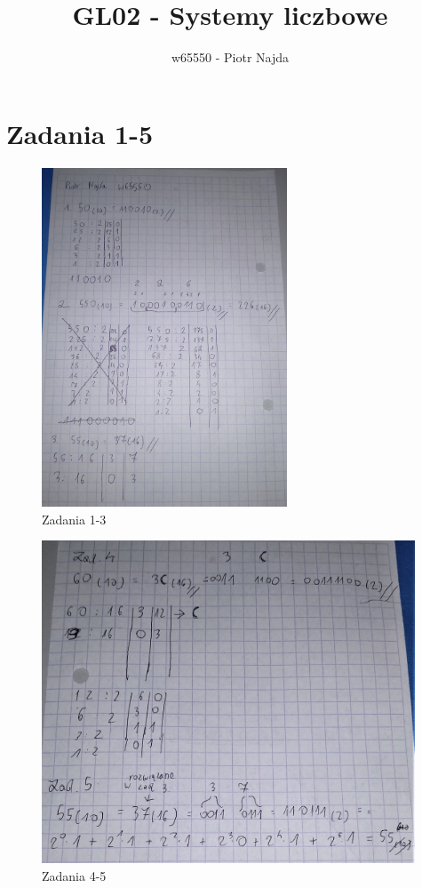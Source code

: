 \documentclass[12pt,a4paper]{article}
\title{GL02 - Systemy liczbowe}
\author{w65550 - Piotr Najda}
\begin{document}
\maketitle

\section{Zadania 1-5}

\begin{figure}[h]
\centering
\includegraphics[width=0.65\textwidth]{IMG_20211026_084539.jpg}
\caption{\label{fig:zad1do3}Zadania 1-3}
\end{figure}

\begin{figure}[t]
\centering
\includegraphics[width=0.99\textwidth]{IMG_20211026_084546.jpg}
\caption{\label{fig:zad4do5}Zadania 4-5}
\end{figure}
\end{document}
